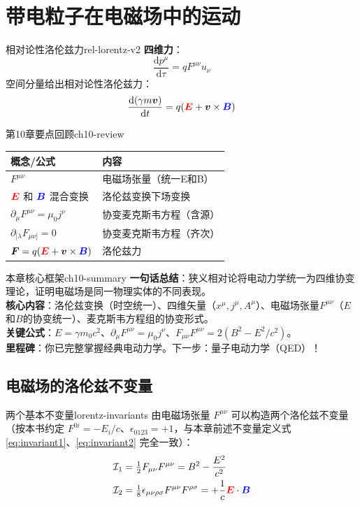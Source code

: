 \documentclass[11pt,a4paper,openany,oneside]{book}
\newcommand{\diff}{\mathrm{d}}
\newcommand{\vecE}{\textcolor{red}{\vect{E}}}
\newcommand{\vecB}{\textcolor{blue}{\vect{B}}}
\newcommand{\muz}{\mu_0}
\newcommand{\vect}[1]{\bm{#1}}
\begin{document}
\section{带电粒子在电磁场中的运动}

\begin{theorem}{相对论性洛伦兹力}{rel-lorentz-v2}
\textbf{四维力}：
\[
\frac{\diff p^\mu}{\diff\tau} = q F^{\mu\nu} u_\nu
\]
空间分量给出相对论性洛伦兹力：
\[
\frac{\diff(\gamma m\vect{v})}{\diff t} = q(\vecE + \vect{v} \times \vecB)
\]
\end{theorem}

\begin{review}{第10章要点回顾}{ch10-review}
\begin{center}
\begin{tabular}{@{}ll@{}}
\toprule
\textbf{概念/公式} & \textbf{内容} \\
\midrule
$F^{\mu\nu}$ & 电磁场张量（统一E和B） \\
$\vecE$ 和 $\vecB$ 混合变换 & 洛伦兹变换下场变换 \\
$\partial_\mu F^{\mu\nu} = \muz j^\nu$ & 协变麦克斯韦方程（含源） \\
$\partial_{[\lambda}F_{\mu\nu]} = 0$ & 协变麦克斯韦方程（齐次） \\
$\vect{F} = q(\vecE + \vect{v}\times\vecB)$ & 洛伦兹力 \\
\bottomrule
\end{tabular}
\end{center}
\end{review}

\begin{tip}{本章核心框架}{ch10-summary}
\textbf{一句话总结}：狭义相对论将电动力学统一为四维协变理论，证明电磁场是同一物理实体的不同表现。\\
\textbf{核心内容}：洛伦兹变换（时空统一）、四维矢量（$x^\mu, j^\mu, A^\mu$）、电磁场张量$F^{\mu\nu}$（$E$和$B$的协变统一）、麦克斯韦方程组的协变形式。\\
\textbf{关键公式}：$E=\gamma m_0c^2$、$\partial_\mu F^{\mu\nu}=\mu_0j^\nu$、$F_{\mu\nu}F^{\mu\nu}=2(B^2-E^2/c^2)$。\\
\textbf{里程碑}：你已完整掌握经典电动力学。下一步：量子电动力学（QED）！
\end{tip}

\subsection{电磁场的洛伦兹不变量}

\begin{theorem}{两个基本不变量}{lorentz-invariants}
由电磁场张量 $F^{\mu\nu}$ 可以构造两个洛伦兹不变量（按本书约定 $F^{0i}=-E_i/c$、$\epsilon_{0123}=+1$，与本章前述不变量定义式 \eqref{eq:invariant1}、\eqref{eq:invariant2} 完全一致）：
\begin{align*}
\mathcal{I}_1 &= \tfrac{1}{2}F_{\mu\nu}F^{\mu\nu} = B^2 - \frac{E^2}{c^2} \\
\mathcal{I}_2 &= \tfrac{1}{8}\epsilon_{\mu\nu\rho\sigma}F^{\mu\nu}F^{\rho\sigma} = +\frac{1}{c}\vecE\cdot\vecB
\end{align*}
\end{theorem}
\end{document}
